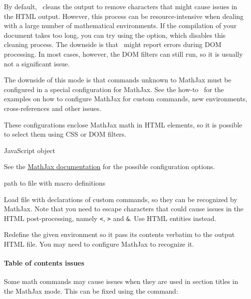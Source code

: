 By default, \texfourht\ cleans the output to remove characters that might cause
issues in the HTML output. However, this process can be resource-intensive when
dealing with a large number of mathematical environments. If the compilation of
your document takes too long, you can try using the  option, which
disables this cleaning process. The downside is that \makefourht\ might report
errors during DOM processing. In most cases, however, the DOM filters can still
run, so it is usually not a significant issue.




The downside of this mode is that commands unknown to MathJax must be configured in a special configuration for
MathJax. See the how-to~ for the examples 
on how to configure MathJax for custom commands, new environments, cross-references
and other issues.

\EndDoc
{}\EndDoc
{}\EndDoc

These configurations enclose MathJax math in HTML elements, so it is possible to select 
them using CSS or DOM filters.


 {JavaScript object}\EndDoc

See the \href{https://docs.mathjax.org/en/latest/options/index.html}{MathJax documentation}
for the possible configuration options. 



 {path to file with macro definitions}\EndDoc

Load file with declarations of custom commands, so they can be recognized 
by MathJax. Note that you need to escape characters that could cause issues
in the HTML post-processing, namely \verb|<|, \verb|>| and \verb|&|. Use 
HTML entities instead.


Redefine the given environment so it pass its contents verbatim to the output HTML file.
You may need to configure MathJax to recognize it.


\paragraph{Table of contents issues}

Some math commands may cause issues when they are used in section titles in the MathJax mode. 
This can be fixed using the \texcommand{\fixmathjaxtoc} command:

